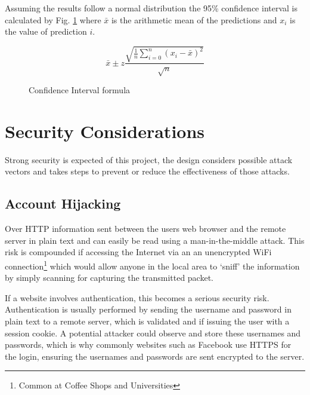 Assuming the results follow a normal distribution the 95\% confidence interval is calculated by Fig. \ref{fig:confidencelevel} where $\bar{x}$ is the arithmetic mean of the predictions and $x_i$ is the value of prediction $i$.

\begin{figure}[h]
    \centering
    \[
        \bar{x} \pm z \frac{
                        \sqrt{
                            \frac{1}{n}
                            \sum\limits_{i=0}^{n}{(x_i - \bar{x})^2}
                        }
                       }{\sqrt{n}}
    \]
    \caption{Confidence Interval formula}
    \label{fig:confidencelevel}
\end{figure}

\section{Security Considerations}
Strong security is expected of this project, the design considers possible attack vectors and takes steps to prevent or reduce the effectiveness of those attacks.

\subsection{Account Hijacking}

Over HTTP information sent between the users web browser and the remote server in plain text and can easily be read using a man-in-the-middle attack. This risk is compounded if accessing the Internet via an an unencrypted WiFi connection\footnote{Common at Coffee Shops and Universities} which would allow anyone in the local area to `sniff' the information by simply scanning for capturing the transmitted packet.

If a website involves authentication, this becomes a serious security risk. Authentication is usually performed by sending the username and password in plain text to a remote server, which is validated and if issuing the user with a session cookie.
%
A potential attacker could observe and store these usernames and passwords, which is why commonly websites such as Facebook use HTTPS for the login, ensuring the usernames and passwords are sent encrypted to the server.

